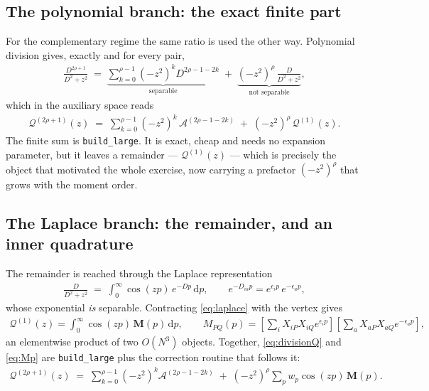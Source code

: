 \documentclass[11pt]{article}
\newcommand{\mat}[1]{{\mathbf{#1}}}
\newcommand{\sqrbrckts}[1]{\left[#1\right]}
\newcommand{\Dcal}{\mathcal{A}}
\newcommand{\Qcal}{\mathcal{Q}}
\newcommand{\code}[1]{\texttt{\small #1}}
\begin{document}
\subsection{The polynomial branch: the exact finite part}

For the complementary regime the same ratio is used the other way. Polynomial division
gives, exactly and for every pair,
\begin{align}
    \frac{D^{2\rho+1}}{D^2+z^2}
    \;=\; \underbrace{\sum_{k=0}^{\rho-1} (-z^2)^k D^{2\rho-1-2k}}_{\text{separable}}
    \;+\; \underbrace{(-z^2)^{\rho}\, \frac{D}{D^2+z^2}}_{\text{not separable}} ,
    \label{eq:division}
\end{align}
which in the auxiliary space reads
\begin{align}
    \Qcal^{(2\rho+1)}(z) \;=\; \sum_{k=0}^{\rho-1} (-z^2)^k\, \Dcal^{(2\rho-1-2k)}
    \;+\; (-z^2)^{\rho}\, \Qcal^{(1)}(z) .
    \label{eq:divisionQ}
\end{align}
The finite sum is \code{build\_large}. It is exact, cheap and needs no expansion parameter,
but it leaves a remainder --- $\Qcal^{(1)}(z)$ --- which is precisely the object that
motivated the whole exercise, now carrying a prefactor $(-z^2)^{\rho}$ that grows with the
moment order.

\subsection{The Laplace branch: the remainder, and an inner quadrature}

The remainder is reached through the Laplace representation
\begin{align}
    \frac{D}{D^2+z^2} \;=\; \int_0^\infty \cos(zp)\, e^{-Dp} \,\mathrm{d}p ,
    \qquad
    e^{-D_{ia} p} = e^{\epsilon_i p}\, e^{-\epsilon_a p} ,
    \label{eq:laplace}
\end{align}
whose exponential \emph{is} separable. Contracting \eqref{eq:laplace} with the vertex gives
\begin{align}
    \Qcal^{(1)}(z) = \int_0^\infty \cos(zp)\, \mat{M}(p) \,\mathrm{d}p ,
    \qquad
    M_{PQ}(p) = \sqrbrckts{\sum_i X_{iP} X_{iQ} e^{\epsilon_i p}}
                \sqrbrckts{\sum_a X_{aP} X_{aQ} e^{-\epsilon_a p}} ,
    \label{eq:Mp}
\end{align}
an elementwise product of two $O(N^3)$ objects. Together, \eqref{eq:divisionQ} and
\eqref{eq:Mp} are \code{build\_large} plus the correction routine that follows it:
\begin{align}
    \Qcal^{(2\rho+1)}(z) \;=\; \sum_{k=0}^{\rho-1} (-z^2)^k \Dcal^{(2\rho-1-2k)}
    \;+\; (-z^2)^{\rho} \sum_{p} w_p \cos(z p)\, \mat{M}(p) .
    \label{eq:largeQ}
\end{align}
\end{document}
